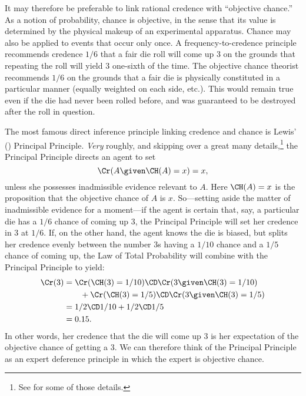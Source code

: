 It may therefore be preferable to link rational credence with ``objective chance.'' As a notion of probability, chance is objective, in the sense that its value is determined by the physical makeup of an experimental apparatus. Chance may also be applied to events that occur only once. A frequency-to-credence principle recommends credence $1/6$ that a fair die roll will come up $3$ on the grounds that repeating the roll will yield $3$ one-sixth of the time. The objective chance theorist recommends $1/6$ on the grounds that a fair die is physically constituted in a particular manner (equally weighted on each side, etc.). This would remain true even if the die had never been rolled before, and was guaranteed to be destroyed after the roll in question.

The most famous direct inference principle linking credence and chance is Lewis' (\citeyear{LewisASGTOC}) Principal Principle. \emph{Very} roughly, and skipping over a great many details,\footnote
{See \citet{MeachamPrincipal} for some of those details.}
the Principal Principle directs an agent to set 
\begin{equation}
\Cr(A \given \CH(A)=x)=x,
\end{equation}
unless she possesses inadmissible evidence relevant to $A$. Here $\CH(A)=x$ is the proposition that the objective chance of $A$ is $x$. So---setting aside the matter of inadmissible evidence for a moment---if the agent is certain that, say, a particular die has a $1/6$ chance of coming up $3$, the Principal Principle will set her credence in $3$ at $1/6$. If, on the other hand, the agent knows the die is biased, but splits her credence evenly between the number $3$s having a $1/10$ chance and a $1/5$ chance of coming up, the Law of Total Probability will combine with the Principal Principle to yield:
\begin{equation}
\begin{aligned}
\Cr(3) &= \Cr(\CH(3)=1/10) \CD \Cr(3 \given \CH(3)=1/10)\\
	   &\qquad +\Cr(\CH(3)=1/5) \CD \Cr(3 \given \CH(3)=1/5)\\
	   &= 1/2 \CD 1/10 + 1/2 \CD 1/5\\
	   &= 0.15.
\end{aligned}
\end{equation}
In other words, her credence that the die will come up $3$ is her expectation of the objective chance of getting a $3$. We can therefore think of the Principal Principle as an expert deference principle in which the expert is objective chance.

